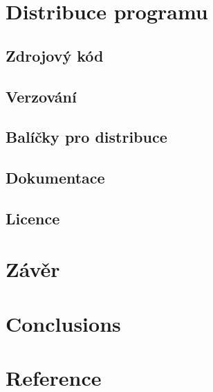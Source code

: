 \documentclass[10pt,a4paper]{article}
\begin{document}
	\section{Distribuce programu}
		\subsection{Zdrojový kód}
		\subsection{Verzování}
		\subsection{Balíčky pro distribuce}
		\subsection{Dokumentace}
		\subsection{Licence}

	\section{Závěr} %
	\section{Conclusions} %
	\section{Reference} %

\end{document}
